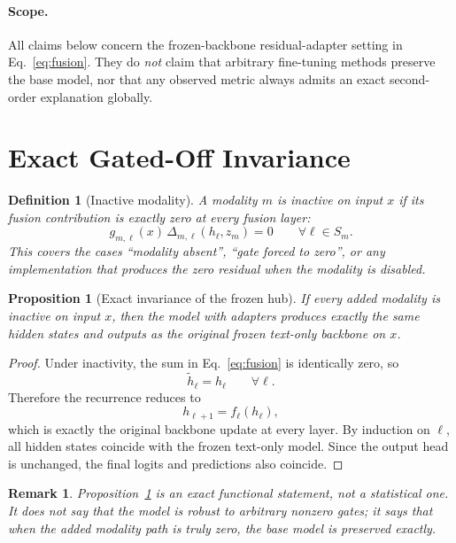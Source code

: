 \documentclass[11pt]{article}
\newtheorem{proposition}{Proposition}
\newtheorem{definition}{Definition}
\newtheorem{remark}{Remark}
\begin{document}
\paragraph{Scope.}
All claims below concern the frozen-backbone residual-adapter setting in
Eq.~\eqref{eq:fusion}. They do \emph{not} claim that arbitrary fine-tuning
methods preserve the base model, nor that any observed metric always admits an
exact second-order explanation globally.

\section{Exact Gated-Off Invariance}

\begin{definition}[Inactive modality]
A modality $m$ is inactive on input $x$ if its fusion contribution is exactly
zero at every fusion layer:
\[
g_{m,\ell}(x)\,\Delta_{m,\ell}(h_\ell, z_m) = 0
\qquad \forall \ell \in S_m.
\]
This covers the cases ``modality absent'', ``gate forced to zero'', or any
implementation that produces the zero residual when the modality is disabled.
\end{definition}

\begin{proposition}[Exact invariance of the frozen hub]
\label{prop:invariance}
If every added modality is inactive on input $x$, then the model with adapters
produces exactly the same hidden states and outputs as the original frozen
text-only backbone on $x$.
\end{proposition}

\begin{proof}
Under inactivity, the sum in Eq.~\eqref{eq:fusion} is identically zero, so
\[
\tilde h_\ell = h_\ell
\qquad \forall \ell.
\]
Therefore the recurrence reduces to
\[
h_{\ell+1} = f_\ell(h_\ell),
\]
which is exactly the original backbone update at every layer. By induction on
$\ell$, all hidden states coincide with the frozen text-only model. Since the
output head is unchanged, the final logits and predictions also coincide.
\end{proof}

\begin{remark}
Proposition~\ref{prop:invariance} is an exact functional statement, not a
statistical one. It does not say that the model is robust to arbitrary
nonzero gates; it says that when the added modality path is truly zero, the
base model is preserved exactly.
\end{remark}
\end{document}

